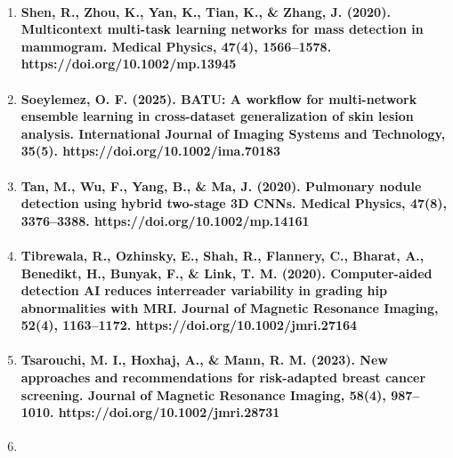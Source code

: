 \begin{enumerate}
  \paragraph{Samoil, S., Fare, C., Jordan, K. E., \& Chen, Z. (2024). History matching reservoir models with many objective Bayesian optimization. Applied AI Letters, 5(4). https://doi.org/10.1002/ail2.99}
\item
  \paragraph{Shen, R., Zhou, K., Yan, K., Tian, K., \& Zhang, J. (2020). Multicontext multi-task learning networks for mass detection in mammogram. Medical Physics, 47(4), 1566–1578. https://doi.org/10.1002/mp.13945}
\item
  \paragraph{Soeylemez, O. F. (2025). BATU: A workflow for multi-network ensemble learning in cross-dataset generalization of skin lesion analysis. International Journal of Imaging Systems and Technology, 35(5). https://doi.org/10.1002/ima.70183}
\item
  \paragraph{Tan, M., Wu, F., Yang, B., \& Ma, J. (2020). Pulmonary nodule detection using hybrid two-stage 3D CNNs. Medical Physics, 47(8), 3376–3388. https://doi.org/10.1002/mp.14161}
\item
  \paragraph{Tibrewala, R., Ozhinsky, E., Shah, R., Flannery, C., Bharat, A., Benedikt, H., Bunyak, F., \& Link, T. M. (2020). Computer-aided detection AI reduces interreader variability in grading hip abnormalities with MRI. Journal of Magnetic Resonance Imaging, 52(4), 1163–1172. https://doi.org/10.1002/jmri.27164}
\item
  \paragraph{Tsarouchi, M. I., Hoxhaj, A., \& Mann, R. M. (2023). New approaches and recommendations for risk-adapted breast cancer screening. Journal of Magnetic Resonance Imaging, 58(4), 987–1010. https://doi.org/10.1002/jmri.28731}
\item

\end{enumerate}
